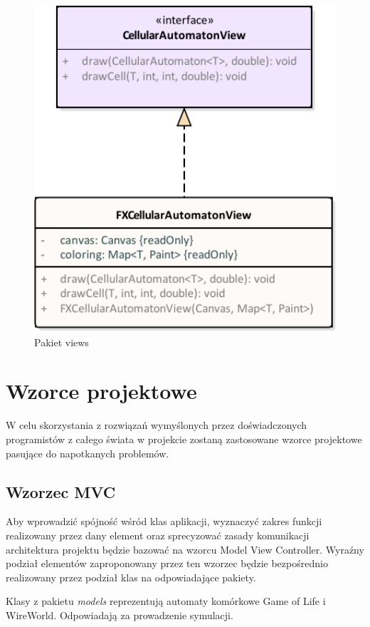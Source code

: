 \documentclass{report}
\begin{document}
\begin{figure}
	\centering
	\hspace*{-3cm}\includegraphics[width=17cm]{Pakiet_views}
	\caption{Pakiet views}
	\label{fig:views}
\end{figure}

\section{Wzorce projektowe}
W celu skorzystania z rozwiązań wymyślonych przez doświadczonych programistów z całego świata w projekcie zostaną zastosowane wzorce projektowe pasujące do napotkanych problemów.

\subsection{Wzorzec MVC}
Aby wprowadzić spójność wśród klas aplikacji, wyznaczyć zakres funkcji realizowany przez dany element oraz sprecyzować zasady komunikacji architektura projektu będzie bazować na wzorcu Model View Controller.
Wyraźny podział elementów zaproponowany przez ten wzorzec będzie bezpośrednio realizowany przez podział klas na odpowiadające pakiety.

Klasy z pakietu \textit{models} reprezentują automaty komórkowe Game of Life i WireWorld. Odpowiadają za prowadzenie symulacji.
\end{document}
